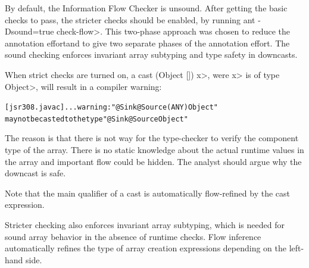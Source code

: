 By default, the Information Flow Checker is unsound.  After getting the basic checks to pass, the
 stricter checks should be enabled, by running \<ant -Dsound=true check-flow>.
This two-phase approach was chosen to reduce
the annotation effortand to give two separate phases of
the annotation effort.
 The sound checking enforces invariant 
array subtyping and type safety in downcasts.


When strict checks are turned on,
a cast \<(Object []) x>, were \<x> is of type \<Object>, will result
in a compiler warning:

\begin{alltt}
[jsr308.javac] ... warning: "@Sink @Source({ANY}) Object"
       may not be casted to the type "@Sink @Source Object"
\end{alltt}

The reason is that there is not way for the type-checker to verify
 the component type of the array. There is no static knowledge about the actual
runtime values in the array and important flow could be hidden.
The analyst should argue why the downcast is safe.

Note that the main qualifier of a cast is automatically flow-refined
by the cast expression.


\medskip

Stricter checking also enforces invariant array subtyping, which is
needed for sound array behavior in the absence of runtime checks.
Flow inference automatically refines the type of array creation
expressions depending on the left-hand side.

\medskip




